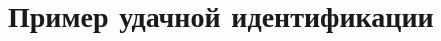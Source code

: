 \documentclass{report}
\begin{document}
        \section{Пример удачной идентификации}
        


    
    \printbibliography
\end{document}
